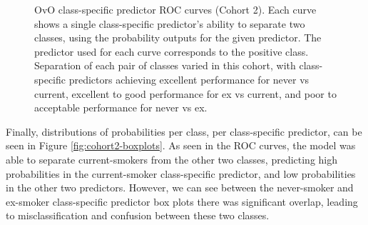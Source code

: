 \documentclass{article} %
\begin{document}
\begin{figure}[p]
\begin{subfigure}{0.46\linewidth}
    \end{subfigure}
    \caption[Class-specific predictor ROC curves (Cohort 2)]{OvO class-specific predictor ROC curves (Cohort 2). Each curve shows a single class-specific predictor's ability to separate two classes, using the probability outputs for the given predictor. The predictor used for each curve corresponds to the positive class. Separation of each pair of classes varied in this cohort, with class-specific predictors achieving excellent performance for never vs current, excellent to good performance for ex vs current, and poor to acceptable performance for never vs ex.}
    \label{fig:cohort2-initial-rocs}
\end{figure}

Finally, distributions of probabilities per class, per class-specific predictor, can be seen in Figure \ref{fig:cohort2-boxplots}. As seen in the ROC curves, the model was able to separate current-smokers from the other two classes, predicting high probabilities in the current-smoker class-specific predictor, and low probabilities in the other two predictors. However, we can see between the never-smoker and ex-smoker class-specific predictor box plots there was significant overlap, leading to misclassification and confusion between these two classes.
\end{document}
